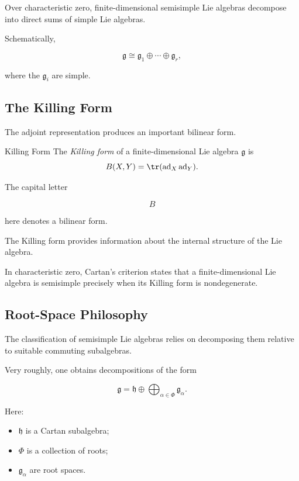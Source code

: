 Over characteristic zero, finite-dimensional semisimple Lie algebras
decompose into direct sums of simple Lie algebras.

Schematically,

\[ \mathfrak g\cong
\mathfrak g_1\oplus\cdots\oplus\mathfrak g_r, \]

where the \(\mathfrak g_i\) are simple.

\subsection{The Killing Form}
\label{subsec:killing-form}

The adjoint representation produces an important bilinear form.

\begin{definitionbox}{Killing Form}
The \emph{Killing form} of a finite-dimensional Lie algebra
\(\mathfrak g\) is
\[ B(X,Y)=\tr(\operatorname{ad}_X\operatorname{ad}_Y). \]
\end{definitionbox}

The capital letter

\[ B \]

here denotes a bilinear form.

The Killing form provides information about the internal structure of the
Lie algebra.

In characteristic zero, Cartan's criterion states that a finite-dimensional
Lie algebra is semisimple precisely when its Killing form is nondegenerate.

\subsection{Root-Space Philosophy}
\label{subsec:root-space-philosophy}

The classification of semisimple Lie algebras relies on decomposing them
relative to suitable commuting subalgebras.

Very roughly, one obtains decompositions of the form

\[ \mathfrak g=\mathfrak h\oplus
\bigoplus_{\alpha\in\Phi}\mathfrak g_\alpha. \]

Here:

\begin{itemize}
    \item \(\mathfrak h\) is a Cartan subalgebra;
    \item \(\Phi\) is a collection of roots;
    \item \(\mathfrak g_\alpha\) are root spaces.
\end{itemize}

